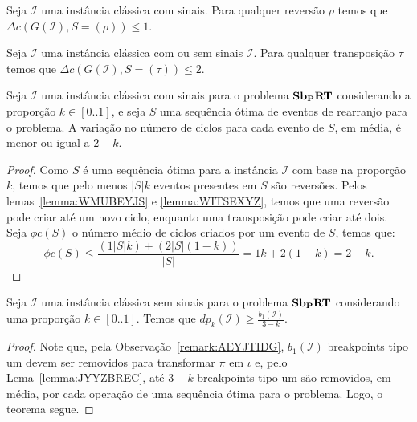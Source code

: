 \begin{lemma}\label{lemma:WMUBEYJS}
Seja $\mathcal{I}$ uma instância clássica com sinais. Para qualquer reversão $\rho$ temos que $\Delta c(G(\mathcal{I}), S = (\rho)) \le 1$.
\end{lemma}

\begin{lemma}\label{lemma:WITSEXYZ}
Seja $\mathcal{I}$ uma instância clássica com ou sem sinais $\mathcal{I}$. Para qualquer transposição $\tau$ temos que $\Delta c(G(\mathcal{I}), S = (\tau)) \le 2$.
\end{lemma}

\begin{lemma}\label{lemma:IMSCPWKN}
Seja $\mathcal{I}$ uma instância clássica com sinais para o problema $\textbf{Sb\textsubscript{P}RT}{}$ considerando a proporção $k \in [0..1]$, e seja $S$ uma sequência ótima de eventos de rearranjo para o problema. A variação no número de ciclos para cada evento de $S$, em média, é menor ou igual a $2-k$.
\end{lemma}
\begin{proof}
Como $S$ é uma sequência ótima para a instância $\mathcal{I}$ com base na proporção $k$, temos que pelo menos $|S|k$ eventos presentes em $S$ são reversões. Pelos lemas~\ref{lemma:WMUBEYJS} e \ref{lemma:WITSEXYZ}, temos que uma reversão pode criar até um novo ciclo, enquanto uma transposição pode criar até dois. Seja $\phi c(S)$ o número médio de ciclos criados por um evento de $S$, temos que:
$$\phi c(S) \leq \frac{(1 |S| k) + (2 |S| (1 - k))}{|S|} = 1k + 2(1 - k) = 2 - k.$$
\end{proof}

\begin{theorem}\label{theorem:KJXGKJIP}
Seja $\mathcal{I}$ uma instância clássica sem sinais para o problema $\textbf{Sb\textsubscript{P}RT}{}$ considerando uma proporção $k \in [0..1]$. Temos que $dp_{k}(\mathcal{I}) \ge \frac{b_1(\mathcal{I})}{3-k}$.
\end{theorem}
\begin{proof}
Note que, pela Observação~\ref{remark:AEYJTIDG}, $b_1(\mathcal{I})$ breakpoints tipo um devem ser removidos para transformar $\pi$ em $\iota$ e, pelo Lema~\ref{lemma:JYYZBREC}, até $3-k$ breakpoints tipo um são removidos, em média, por cada operação de uma sequência ótima para o problema. Logo, o teorema segue.
\end{proof}

